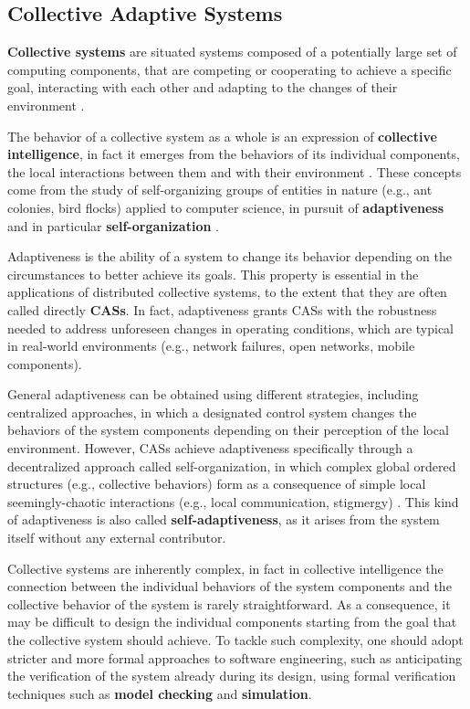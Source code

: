 
\subsection{Collective Adaptive Systems}
\label{section:background:concepts:cas}

\textbf{Collective systems} are situated systems composed of a
potentially large set of computing components, that are competing or cooperating
to achieve a specific goal, interacting with each other and adapting to the
changes of their environment \cite{CAS}.

The behavior of a collective system as a whole is an expression of
\textbf{collective intelligence}, in fact it emerges from the behaviors of its
individual components, the local interactions between them and with their
environment \cite{CollectiveIntelligence}. These concepts come from the study
of self-organizing groups of entities in nature (e.g., ant colonies, bird
flocks) applied to computer science, in pursuit of \textbf{adaptiveness} and in
particular \textbf{self-organization} \cite{SwarmIntelligence}.

Adaptiveness is the ability of a system to change its behavior depending on the
circumstances to better achieve its goals. This property is essential in the
applications of distributed collective systems, to the extent that they are
often called directly \textbf{\acp{CAS}}. In fact, adaptiveness grants
\acp{CAS} with the robustness needed to address unforeseen changes in operating
conditions, which are typical in real-world environments (e.g., network
failures, open networks, mobile components).

General adaptiveness can be obtained using different strategies, including
centralized approaches, in which a designated control system changes the
behaviors of the system components depending on their perception of the local
environment. However, \acp{CAS} achieve adaptiveness specifically through a
decentralized approach called self-organization, in which complex global
ordered structures (e.g., collective behaviors) form as a consequence of simple
local seemingly-chaotic interactions (e.g., local communication, stigmergy)
\cite{SelfOrganization}. This kind of adaptiveness is also called
\textbf{self-adaptiveness}, as it arises from the system itself without any
external contributor.

Collective systems are inherently complex, in fact in collective intelligence
the connection between the individual behaviors of the system components and
the collective behavior of the system is rarely straightforward. As a
consequence, it may be difficult to design the individual components starting
from the goal that the collective system should achieve. To tackle such
complexity, one should adopt stricter and more formal approaches to software
engineering, such as anticipating the verification of the system already during
its design, using formal verification techniques such as \textbf{model
checking} and \textbf{simulation}.


